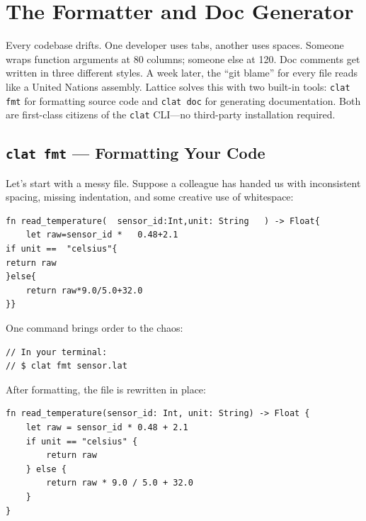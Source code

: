 \chapter{The Formatter and Doc Generator}\label{ch:formatter-docgen}


Every codebase drifts.
One developer uses tabs, another uses spaces.
Someone wraps function arguments at 80 columns; someone else at 120.
Doc comments get written in three different styles.
A week later, the ``git blame'' for every file reads like a United Nations assembly.
Lattice solves this with two built-in tools: \lstinline|clat fmt| for formatting source code and \lstinline|clat doc| for generating documentation.
Both are first-class citizens of the \lstinline|clat| CLI---no third-party installation required.

\section{\texttt{clat fmt} --- Formatting Your Code}\label{sec:clat-fmt}

Let's start with a messy file.
Suppose a colleague has handed us  with inconsistent spacing, missing indentation, and some creative use of whitespace:

\begin{lstlisting}[language=Lattice, caption={Before formatting: messy whitespace and indentation}]
fn read_temperature(  sensor_id:Int,unit: String   ) -> Float{
    let raw=sensor_id *   0.48+2.1
if unit ==  "celsius"{
return raw
}else{
    return raw*9.0/5.0+32.0
}}
\end{lstlisting}

One command brings order to the chaos:

\begin{lstlisting}[language=Lattice, caption={Terminal: running clat fmt}]
// In your terminal:
// $ clat fmt sensor.lat
\end{lstlisting}

After formatting, the file is rewritten in place:

\begin{lstlisting}[language=Lattice, caption={After formatting: clean and consistent}]
fn read_temperature(sensor_id: Int, unit: String) -> Float {
    let raw = sensor_id * 0.48 + 2.1
    if unit == "celsius" {
        return raw
    } else {
        return raw * 9.0 / 5.0 + 32.0
    }
}
\end{lstlisting}

